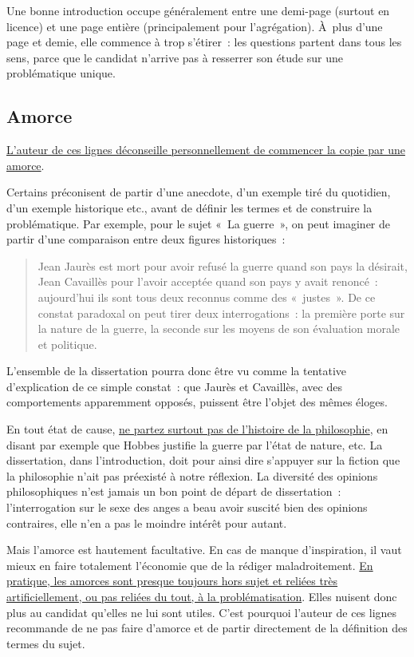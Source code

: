 \documentclass[a4paper,12pt]{article}
\begin{document}
Une bonne introduction occupe généralement entre une demi-page (surtout
en licence) et une page entière (principalement pour l'agrégation).
À plus d'une page et demie, elle commence à trop s'étirer : les
questions partent dans tous les sens, parce que le candidat n'arrive pas
à resserrer son étude sur une problématique unique.

\subsection{Amorce}
\label{sec:org3c2c4b0}
\label{org5a9aa7a}

\uline{L'auteur de ces lignes déconseille personnellement de commencer la
copie par une amorce}.

Certains préconisent de partir d'une anecdote, d'un exemple tiré du
quotidien, d'un exemple historique etc., avant de définir les termes et
de construire la problématique. Par exemple, pour le sujet « La
guerre », on peut imaginer de partir d'une comparaison entre deux
figures historiques :
\begin{quote}
Jean Jaurès est mort pour avoir refusé la guerre quand son pays la
désirait, Jean Cavaillès pour l'avoir acceptée quand son pays y avait
renoncé : aujourd'hui ils sont tous deux reconnus comme des « justes ».
De ce constat paradoxal on peut tirer deux interrogations : la
première porte sur la nature de la guerre, la seconde sur les moyens
de son évaluation morale et politique.
\end{quote}
L'ensemble de la dissertation pourra donc être vu comme la tentative
d'explication de ce simple constat : que Jaurès et Cavaillès, avec des
comportements apparemment opposés, puissent être l'objet des mêmes
éloges.

En tout état de cause, \uline{ne partez surtout pas de l'histoire de la
philosophie}, en disant par exemple que Hobbes justifie la guerre par
l'état de nature, etc. La dissertation, dans l'introduction, doit pour
ainsi dire s'appuyer sur la fiction que la philosophie n'ait pas
préexisté à notre réflexion. La diversité des opinions philosophiques
n'est jamais un bon point de départ de dissertation : l'interrogation
sur le sexe des anges a beau avoir suscité bien des opinions contraires,
elle n'en a pas le moindre intérêt pour autant.

Mais l'amorce est hautement facultative. En cas de manque d'inspiration,
il vaut mieux en faire totalement l'économie que de la rédiger
maladroitement. \uline{En pratique, les amorces sont presque toujours hors
sujet et reliées très artificiellement, ou pas reliées du tout, à la
problématisation}. Elles nuisent donc plus au candidat qu'elles ne lui
sont utiles. C'est pourquoi l'auteur de ces lignes recommande de ne pas
faire d'amorce et de partir directement de la définition des termes du
sujet.
\end{document}
